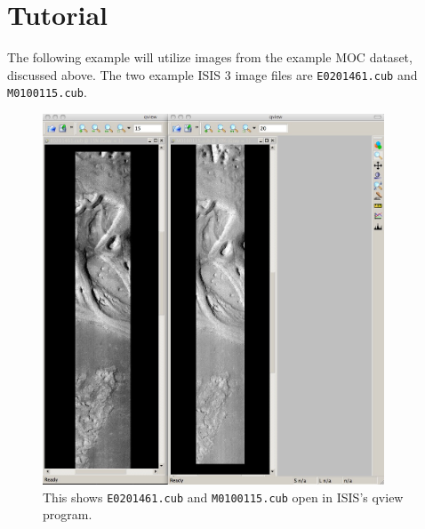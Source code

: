 % 
% 
% 
% 


\section{Tutorial}

The following example will utilize images from the example MOC
dataset, discussed above.  The two example ISIS 3 image files are
\texttt{E0201461.cub} and \texttt{M0100115.cub}.

\begin{figure}
\begin{center}
\includegraphics[width=4in]{images/p19-images.png}
\caption[P19 images open in qview]{
    \label{p19-images}
    This shows \texttt{E0201461.cub} and \texttt{M0100115.cub} open in
	ISIS's qview program.
    }
\end{center}
\end{figure}

